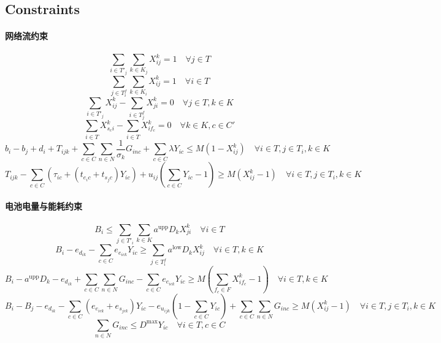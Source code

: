 \documentclass[11pt]{ctexart}
\begin{document}
\subsection*{Constraints}
\paragraph{网络流约束}
\begin{equation}
\sum_{i \in T'_j} \sum_{k \in K_j} X^k_{ij} = 1 \quad \forall j \in T \tag{2}
\end{equation}
\begin{equation}
\sum_{j \in T^f_i} \sum_{k \in K_i} X^k_{ij} = 1 \quad \forall i \in T \tag{3}
\end{equation}
\begin{equation}
\sum_{i \in T'_j} X^k_{ij} - \sum_{i \in T^f_j} X^k_{ji} = 0 \quad \forall j \in T, k \in K \tag{4}
\end{equation}
\begin{equation}
\sum_{i \in T} X^k_{s_c i} - \sum_{i \in T} X^k_{i f_c} = 0 \quad \forall k \in K, c \in C' \tag{5}
\end{equation}
\begin{equation}
b_i - b_j + d_i + T_{ijk} + \sum_{c \in C} \sum_{n \in N} \frac{1}{\sigma_k} G_{inc} + \sum_{c \in C} \lambda Y_{ic} \le M(1 - X^k_{ij}) \quad \forall i \in T, j \in T_i, k \in K \tag{6}
\end{equation}
\begin{equation}
T_{ijk} - \sum_{c \in C} \left( \tau_{ic} + (t_{e_i c} + t_{s_j c}) Y_{ic} \right) + u_{ij} \left( \sum_{c \in C} Y_{ic} - 1 \right) \ge M(X^k_{ij} - 1) \quad \forall i \in T, j \in T_i, k \in K \tag{7}
\end{equation}
\paragraph{电池电量与能耗约束}
\begin{equation}
B_i \le \sum_{j \in T'_i} \sum_{k \in K} a^{\text{upp}} D_k X^k_{ji} \quad \forall i \in T \tag{8}
\end{equation}
\begin{equation}
B_i - e_{d_{ik}} - \sum_{c \in C} e_{e_{ic k}} Y_{ic} \ge \sum_{j \in T^f_i} a^{\text{low}} D_k X^k_{ij} \quad \forall i \in T, k \in K \tag{9}
\end{equation}
\begin{equation}
B_i - a^{\text{upp}} D_k - e_{d_{ik}} + \sum_{c \in C} \sum_{n \in N} G_{inc} - \sum_{c \in C} e_{e_{ic k}} Y_{ic} \ge M \left( \sum_{f_c \in F} X^k_{i f_c} - 1 \right) \quad \forall i \in T, k \in K \tag{10}
\end{equation}
\begin{equation}
B_i - B_j - e_{d_{ik}} - \sum_{c \in C} (e_{e_{ic k}} + e_{s_{j c k}}) Y_{ic} - e_{u_{ij k}} \left( 1 - \sum_{c \in C} Y_{ic} \right) + \sum_{c \in C} \sum_{n \in N} G_{inc} \ge M(X^k_{ij} - 1) \quad \forall i \in T, j \in T_i, k \in K \tag{11}
\end{equation}
\begin{equation}
\sum_{n \in N} G_{inc} \le D^{\max} Y_{ic} \quad \forall i \in T, c \in C \tag{12}
\end{equation}
\end{document}
